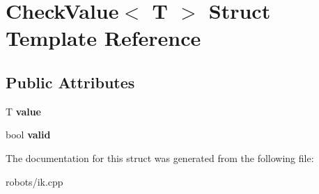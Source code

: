 \section{Check\-Value$<$ T $>$ Struct Template Reference}
\label{struct_check_value}
\subsection*{Public Attributes}
\begin{DoxyCompactItemize}
\item 
T {\bfseries value}\label{struct_check_value_a96d0c95abbb5c848c92f09df55d253a1}

\item 
bool {\bfseries valid}\label{struct_check_value_a3be5a3feb4357bf37b01eef7fd5cc767}

\end{DoxyCompactItemize}


The documentation for this struct was generated from the following file\-:\begin{DoxyCompactItemize}
\item 
robots/ik.\-cpp\end{DoxyCompactItemize}
